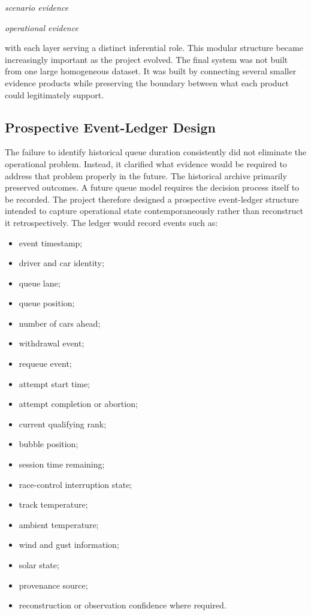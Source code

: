 \begin{center}\textit{scenario evidence}\end{center}

\begin{center}\textit{operational evidence}\end{center}

with each layer serving a distinct inferential role. This modular structure became increasingly important as the project evolved. The final system was not built from one large homogeneous dataset. It was built by connecting several smaller evidence products while preserving the boundary between what each product could legitimately support.

\subsection{Prospective Event-Ledger Design}
The failure to identify historical queue duration consistently did not eliminate the operational problem. Instead, it clarified what evidence would be required to address that problem properly in the future. The historical archive primarily preserved outcomes. A future queue model requires the decision process itself to be recorded. The project therefore designed a prospective event-ledger structure intended to capture operational state contemporaneously rather than reconstruct it retrospectively. The ledger would record events such as:

\begin{itemize}
\item event timestamp;
\item driver and car identity;
\item queue lane;
\item queue position;
\item number of cars ahead;
\item withdrawal event;
\item requeue event;
\item attempt start time;
\item attempt completion or abortion;
\item current qualifying rank;
\item bubble position;
\item session time remaining;
\item race-control interruption state;
\item track temperature;
\item ambient temperature;
\item wind and gust information;
\item solar state;
\item provenance source;
\item reconstruction or observation confidence where required.
\end{itemize}

